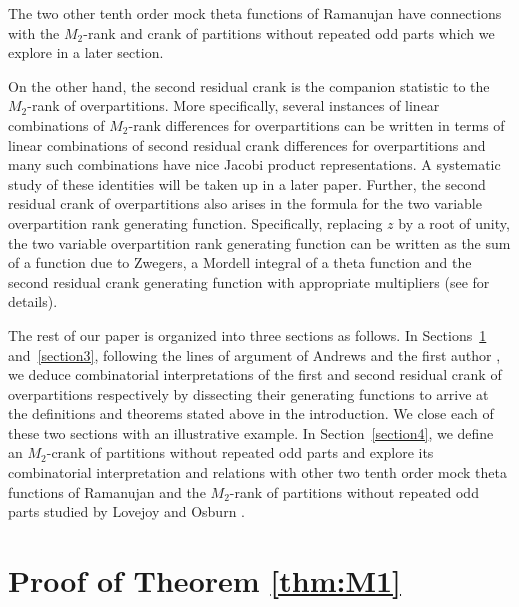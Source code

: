 \documentclass[10pt,a4paper]{amsart}
\numberwithin{equation}{section}
\newcommand\thm[1]{\ref{thm:#1}}
\begin{document}
The two other tenth order mock theta functions of Ramanujan have connections with the $M_2$-rank and crank of partitions without repeated odd parts which we explore in a later section.

On the other hand, the second residual crank is the companion statistic to the $M_2$-rank of overpartitions. More specifically, several instances of linear combinations of $M_2$-rank differences for overpartitions can be written in terms of linear combinations of second residual crank differences for overpartitions and many such combinations have nice Jacobi product representations. A systematic study of these identities will be taken up in a later paper. Further, the second residual crank of overpartitions also arises in the formula for the two variable overpartition rank generating function. Specifically, replacing $z$ by a root of unity, the two variable overpartition rank generating function can be written as the sum of a function due to Zwegers, a Mordell integral of a theta function and the second residual crank generating function with appropriate multipliers (see \cite[Corollary 2.2]{JS} for details).

The rest of our paper is organized into three sections as follows. In Sections~\ref{section2} and~\ref{section3}, following the lines of argument of Andrews and the first author \cite{An-Ga88}, we deduce combinatorial interpretations of the first and second residual crank of overpartitions respectively by dissecting their generating functions to arrive at the definitions and theorems stated above in the introduction. We close each of these two sections with an illustrative example. In Section~\ref{section4}, we define an $M_2$-crank of partitions without repeated odd parts and explore its combinatorial interpretation and relations with other two tenth order mock theta functions of Ramanujan and the $M_2$-rank of partitions without repeated odd parts studied by Lovejoy and Osburn \cite{Lo-Os09}.



\section{Proof of Theorem \thm{M1}}\label{section2}
\end{document}
